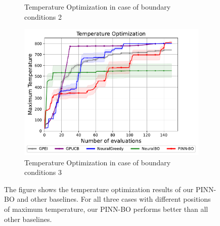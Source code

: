 \begin{figure}[ht]
\begin{subfigure}[b]{0.49\textwidth}
        \caption{Temperature Optimization in case of boundary conditions 2}
        \label{fig:heat_2_opt}
    \end{subfigure}
    \hfill
    \begin{subfigure}[b]{0.5\textwidth}
        \centering
        \includegraphics[width=\textwidth]{Figures/PINN-BO/Heat_dim_2_bc3.pdf}
        \caption{Temperature Optimization in case of boundary conditions 3}
        \label{fig:heat_3_opt}
    \end{subfigure}
    \caption{The figure shows the temperature optimization results of our PINN-BO and other baselines. For all three cases with different positions of maximum temperature, our PINN-BO performs better than all other baselines.}
    \label{fig:heat_opt}
\end{figure}



